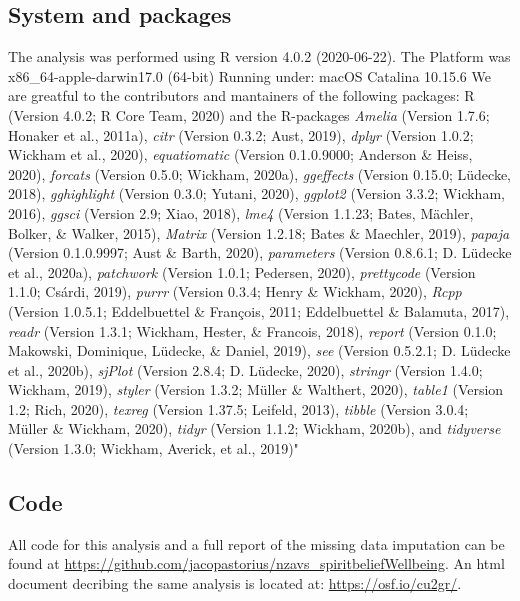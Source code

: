\documentclass[
  english,
  man,floatsintext]{apa6}
\begin{document}
\hypertarget{system-and-packages}{%
\subsection{System and packages}\label{system-and-packages}}

The analysis was performed using R version 4.0.2 (2020-06-22). The Platform was x86\_64-apple-darwin17.0 (64-bit) Running under: macOS Catalina 10.15.6
We are greatful to the contributors and mantainers of the following packages:
R (Version 4.0.2; R Core Team, 2020) and the R-packages \emph{Amelia} (Version 1.7.6; Honaker et al., 2011a), \emph{citr} (Version 0.3.2; Aust, 2019), \emph{dplyr} (Version 1.0.2; Wickham et al., 2020), \emph{equatiomatic} (Version 0.1.0.9000; Anderson \& Heiss, 2020), \emph{forcats} (Version 0.5.0; Wickham, 2020a), \emph{ggeffects} (Version 0.15.0; Lüdecke, 2018), \emph{gghighlight} (Version 0.3.0; Yutani, 2020), \emph{ggplot2} (Version 3.3.2; Wickham, 2016), \emph{ggsci} (Version 2.9; Xiao, 2018), \emph{lme4} (Version 1.1.23; Bates, Mächler, Bolker, \& Walker, 2015), \emph{Matrix} (Version 1.2.18; Bates \& Maechler, 2019), \emph{papaja} (Version 0.1.0.9997; Aust \& Barth, 2020), \emph{parameters} (Version 0.8.6.1; D. Lüdecke et al., 2020a), \emph{patchwork} (Version 1.0.1; Pedersen, 2020), \emph{prettycode} (Version 1.1.0; Csárdi, 2019), \emph{purrr} (Version 0.3.4; Henry \& Wickham, 2020), \emph{Rcpp} (Version 1.0.5.1; Eddelbuettel \& François, 2011; Eddelbuettel \& Balamuta, 2017), \emph{readr} (Version 1.3.1; Wickham, Hester, \& Francois, 2018), \emph{report} (Version 0.1.0; Makowski, Dominique, Lüdecke, \& Daniel, 2019), \emph{see} (Version 0.5.2.1; D. Lüdecke et al., 2020b), \emph{sjPlot} (Version 2.8.4; D. Lüdecke, 2020), \emph{stringr} (Version 1.4.0; Wickham, 2019), \emph{styler} (Version 1.3.2; Müller \& Walthert, 2020), \emph{table1} (Version 1.2; Rich, 2020), \emph{texreg} (Version 1.37.5; Leifeld, 2013), \emph{tibble} (Version 3.0.4; Müller \& Wickham, 2020), \emph{tidyr} (Version 1.1.2; Wickham, 2020b), and \emph{tidyverse} (Version 1.3.0; Wickham, Averick, et al., 2019)"

\hypertarget{code}{%
\subsection{Code}\label{code}}

All code for this analysis and a full report of the missing data imputation can be found at \url{https://github.com/jacopastorius/nzavs_spiritbeliefWellbeing}. An html document decribing the same analysis is located at: \url{https://osf.io/cu2gr/}.
\end{document}
